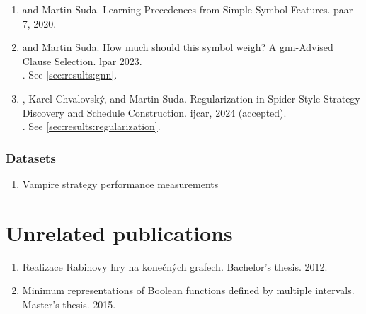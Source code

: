 \begin{enumerate}
\item {} and Martin Suda. Learning Precedences from Simple Symbol Features. \Gls{paar} 7, 2020. \cite{DBLP:conf/cade/Bartek020}
\item {} and Martin Suda. How much should this symbol weigh? A \acrshort{gnn}-Advised Clause Selection. \Gls{lpar} 2023. \cite{DBLP:conf/lpar/Bartek023}
\\
. See \cref{sec:results:gnn}.
\item {}, Karel Chvalovský, and Martin Suda. Regularization in Spider-Style Strategy Discovery and Schedule Construction. \Gls{ijcar}, 2024 (accepted). \cite{bartek2024regularization}
\\
. See \cref{sec:results:regularization}.
\end{enumerate}



\subsubsection{Datasets}

\begin{enumerate}
\item Vampire strategy performance measurements \cite{bartek_2024_10814478}
\end{enumerate}

\section{Unrelated publications}

\begin{enumerate}
\item \foreignlanguage{czech}{Realizace Rabinovy hry na konečných grafech}. Bachelor's thesis. 2012. \cite{Bartek2012thesis}
\item Minimum representations of Boolean functions defined by multiple intervals. Master's thesis. 2015. \cite{bartek_2015}
\end{enumerate}

